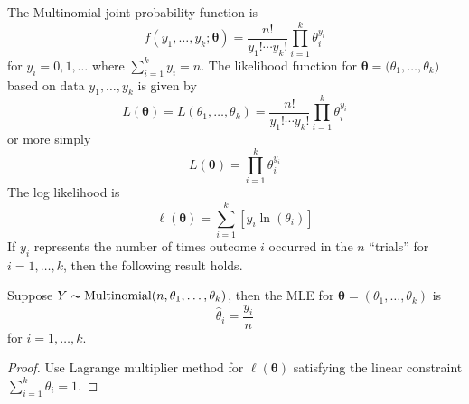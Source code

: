 The Multinomial joint probability function is
\[ f(y_1,\ldots ,y_k;\bm{\theta})=\frac{n!}{y_1!\cdots y_k!}\prod_{i=1}^k \theta_i^{y_i} \]
for $ y_i=0,1,\ldots $ where $ \sum\limits_{i=1}^{k} y_i = n $.
The likelihood function for $ \bm{\theta}=\bm(\theta_1,\ldots ,\theta_k) $ based on data
$ y_1,\ldots ,y_k $ is given by
\[ L(\bm{\theta})=L(\theta_1,\ldots ,\theta_k)=\frac{n!}{y_1!\cdots y_k!} \prod_{i=1}^k
    \theta_i^{y_i} \]
or more simply
\[ L(\bm{\theta})=\prod_{i=1}^k \theta_i^{y_i} \]
The log likelihood is
\[ \ell(\bm{\theta})=\sum\limits_{i=1}^{k} \left[ y_i\ln(\theta_i) \right] \]
If $ y_i $ represents the number of times outcome $ i $ occurred in the $ n $ ``trials''
for $ i=1,\ldots ,k $, then the following result holds.
\begin{thmbox}
    \begin{prop}
        Suppose $ Y \thicksim \operatorname{Multinomial}(n,\theta_1,\ldots ,\theta_k) $, then the MLE for
        $ \bm{\theta}=(\theta_1,\ldots ,\theta_k) $ is
        \[ \hat{\theta}_i=\frac{y_i}{n} \]
        for $ i=1,\ldots ,k $.
    \end{prop}
\end{thmbox}
\begin{proof}
    Use Lagrange multiplier method for $ \ell(\bm{\theta}) $ satisfying the linear
    constraint $ \sum\limits_{i=1}^{k} \theta_i=1 $.
\end{proof}

